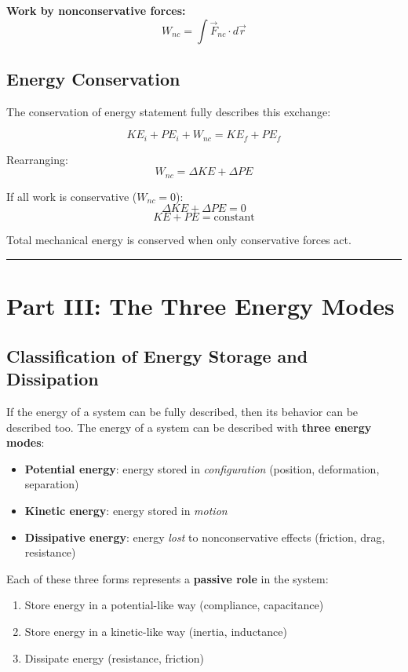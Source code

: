 \documentclass[
]{article}
\providecommand{\tightlist}{%
  \setlength{\itemsep}{0pt}\setlength{\parskip}{0pt}}
\begin{document}
\textbf{Work by nonconservative forces:}
\[W_{nc} = \int \vec{F}_{nc} \cdot d\vec{r}\]

\subsection{Energy Conservation}\label{energy-conservation}

The conservation of energy statement fully describes this exchange:

\[KE_i + PE_i + W_{nc} = KE_f + PE_f\]

Rearranging: \[W_{nc} = \Delta KE + \Delta PE\]

If all work is conservative (\(W_{nc} = 0\)):
\[\Delta KE + \Delta PE = 0\] \[KE + PE = \text{constant}\]

Total mechanical energy is conserved when only conservative forces act.

\begin{center}\rule{0.5\linewidth}{0.5pt}\end{center}

\section{Part III: The Three Energy
Modes}\label{part-iii-the-three-energy-modes}

\subsection{Classification of Energy Storage and
Dissipation}\label{classification-of-energy-storage-and-dissipation}

If the energy of a system can be fully described, then its behavior can
be described too. The energy of a system can be described with
\textbf{three energy modes}:

\begin{itemize}
\tightlist
\item
  \textbf{Potential energy}: energy stored in \emph{configuration}
  (position, deformation, separation)
\item
  \textbf{Kinetic energy}: energy stored in \emph{motion}
\item
  \textbf{Dissipative energy}: energy \emph{lost} to nonconservative
  effects (friction, drag, resistance)
\end{itemize}

Each of these three forms represents a \textbf{passive role} in the
system:

\begin{enumerate}
\def\labelenumi{\arabic{enumi}.}
\tightlist
\item
  Store energy in a potential-like way (compliance, capacitance)
\item
  Store energy in a kinetic-like way (inertia, inductance)
\item
  Dissipate energy (resistance, friction)
\end{enumerate}
\end{document}
